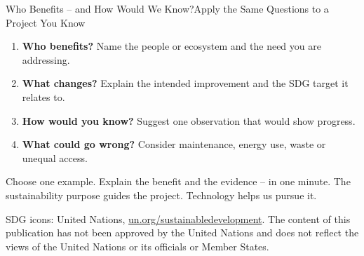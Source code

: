 \begin{frame}{Who Benefits -- and How Would We Know?}{Apply the Same Questions to a Project You Know}
\begin{enumerate}
    \item \textbf{Who benefits?} Name the people or ecosystem and the need you are addressing.
    \item \textbf{What changes?} Explain the intended improvement and the SDG target it relates to.
    \item \textbf{How would you know?} Suggest one observation that would show progress.
    \item \textbf{What could go wrong?} Consider maintenance, energy use, waste or unequal access.
\end{enumerate}
\vspace{1em}
\alert{Choose one example. Explain the benefit and the evidence -- in one minute.}
\vfill
{\large The sustainability purpose guides the project. Technology helps us pursue it.}
\par\vspace{.7em}
{\tiny SDG icons: United Nations, \href{https://www.un.org/sustainabledevelopment/}{un.org/sustainabledevelopment}. The content of this publication has not been approved by the United Nations and does not reflect the views of the United Nations or its officials or Member States.}
\end{frame}
